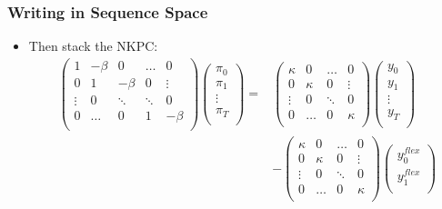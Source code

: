 \documentclass[english,xcolor=svgnames]{beamer}
\begin{document}
\begin{frame}
    \frametitle{Writing in Sequence Space}
    \begin{itemize}
        \item Then stack the NKPC:
        \begin{align*}
        	\begin{pmatrix}
        		1 & -\beta & 0 & \hdots & 0 \\
        		0 & 1 & -\beta & 0 & \vdots \\
        		\vdots & 0 & \ddots & \ddots & 0 \\
        		0 & \hdots & 0 & 1 & -\beta \\
        	\end{pmatrix}
        	\begin{pmatrix}
        		\pi_0 \\
        		\pi_1 \\
        		\vdots \\
        		\pi_T \\
        	\end{pmatrix}
        	=&\begin{pmatrix}
        		\kappa & 0 & \hdots & 0  \\
        		0 & \kappa & 0 & \vdots  \\
        		\vdots & 0 & \ddots & 0  \\
        		0 & \hdots & 0 & \kappa  \\
        	\end{pmatrix}
        	\begin{pmatrix}
        		y_0 \\
        		y_1 \\
        		\vdots \\
        		y_T \\
        	\end{pmatrix}
        	\\
        	&-\begin{pmatrix}
        		\kappa & 0 & \hdots & 0  \\
        		0 & \kappa & 0 & \vdots  \\
        		\vdots & 0 & \ddots & 0  \\
        		0 & \hdots & 0 & \kappa  \\
        	\end{pmatrix}
        	\begin{pmatrix}
        		y_0^{flex} \\
        		y_1^{flex} \\

\end{pmatrix}
\end{align*}
\end{itemize}
\end{frame}
\end{document}
